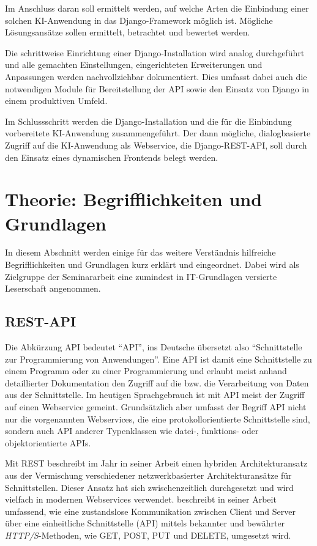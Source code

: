 \documentclass[12pt,oneside,titlepage,listof=totoc,bibliography=totoc]{scrartcl}
\begin{document}
Im Anschluss daran soll ermittelt werden, auf welche Arten die Einbindung einer solchen KI-Anwendung in das Django-Framework möglich ist. Mögliche Lösungsansätze sollen ermittelt, betrachtet und bewertet werden. 

Die schrittweise Einrichtung einer Django-Installation wird analog durchgeführt und alle gemachten Einstellungen, eingerichteten Erweiterungen und Anpassungen werden nachvollziehbar dokumentiert. Dies umfasst dabei auch die notwendigen Module für Bereitstellung der API sowie den Einsatz von Django in einem produktiven Umfeld. 

Im Schlussschritt werden die Django-Installation und die für die Einbindung vorbereitete KI-Anwendung zusammengeführt. Der dann mögliche, dialogbasierte Zugriff auf die KI-Anwendung als Webservice, die Django-REST-API, soll durch den Einsatz eines dynamischen Frontends belegt werden. 


\newpage
\section{Theorie: Begrifflichkeiten und Grundlagen}

In diesem Abschnitt werden einige für das weitere Verständnis hilfreiche Begrifflichkeiten und Grundlagen kurz erklärt und eingeordnet. Dabei wird als Zielgruppe der Seminararbeit eine zumindest in IT-Grundlagen versierte Leserschaft angenommen.


\subsection{REST-API}

Die Abkürzung \acs{API} bedeutet \enquote{\acl{API}}, ins Deutsche übersetzt also \enquote{Schnittstelle zur Programmierung von Anwendungen}. Eine API ist damit eine Schnittstelle zu einem Programm oder zu einer Programmierung und erlaubt meist anhand detaillierter Dokumentation den Zugriff auf die  bzw. die Verarbeitung von Daten aus der Schnittstelle. Im heutigen Sprachgebrauch ist mit API  meist der Zugriff auf einen Webservice gemeint. Grundsätzlich aber umfasst der Begriff API nicht nur die vorgenannten Webservices, die eine protokollorientierte Schnittstelle sind, sondern auch API anderer Typenklassen wie datei-, funktions- oder objektorientierte APIs.

Mit \ac{REST} beschreibt \citeauthor[]{51-fielding-rest} im Jahr \citeyear[]{51-fielding-rest} in seiner Arbeit  einen hybriden Architekturansatz aus der Vermischung verschiedener netzwerkbasierter Architekturansätze für Schnittstellen. Dieser Ansatz hat sich zwischenzeitlich durchgesetzt und wird vielfach in modernen Webservices verwendet. \citeauthor[]{51-fielding-rest} beschreibt in seiner Arbeit umfassend, wie eine zustandslose Kommunikation zwischen Client und Server über eine einheitliche Schnittstelle (API) mittels bekannter und bewährter \textit{\ac{HTTP/S}}-Methoden, wie GET, POST, PUT und DELETE, umgesetzt wird.
\end{document}
